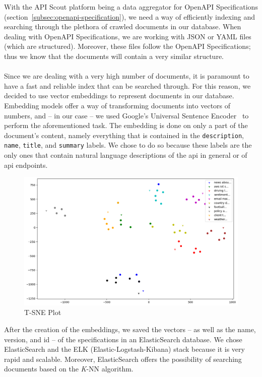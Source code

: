 With the API Scout platform being a data aggregator for OpenAPI Specifications (section~\ref{subsec:openapi-specification}), we need a way of efficiently indexing and searching through the plethora of crawled documents in our database.
When dealing with OpenAPI Specifications, we are working with JSON or YAML files (which are structured).
Moreover, these files follow the OpenAPI Specifications; thus we know that the documents will contain a very similar structure. \\ \\
Since we are dealing with a very high number of documents, it is paramount to have a fast and reliable index that can be searched through.
For this reason, we decided to use vector embeddings to represent documents in our database.
Embedding models offer a way of transforming documents into vectors of numbers, and -- in our case -- we used Google's Universal Sentence Encoder~\cite{cer2018universal} to perform the aforementioned task.
The embedding is done on only a part of the document's content, namely everything that is contained in the \verb|description|, \verb|name|, \verb|title|, and \verb|summary| labels.
We chose to do so because these labels are the only ones that contain natural language descriptions of the api in general or of api endpoints.
\begin{figure}
    \centering
    \includegraphics[width=13cm]{../out/plots/SNE}
    \caption{T-SNE Plot}
    \label{fig:tSNE-plot}
\end{figure}
After the creation of the embeddings, we saved the vectors -- as well as the name, version, and id -- of the specifications in an ElasticSearch database.
We chose ElasticSearch and the ELK (Elastic-Logstash-Kibana) stack because it is very rapid and scalable.
Moreover, ElasticSearch offers the possibility of searching documents based on the \textit{K}-NN algorithm.
